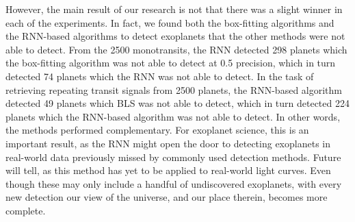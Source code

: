 However, the main result of our research is not that there was a slight winner in each of the experiments. In fact, we found both the box-fitting algorithms and the RNN-based algorithms to detect exoplanets that the other methods were not able to detect. From the 2500 monotransits, the RNN detected 298 planets which the box-fitting algorithm was not able to detect at 0.5 precision, which in turn detected 74 planets which the RNN was not able to detect. In the task of retrieving repeating transit signals from 2500 planets, the RNN-based algorithm detected 49 planets which BLS was not able to detect, which in turn detected 224 planets which the RNN-based algorithm was not able to detect. In other words, the methods performed complementary. For exoplanet science, this is an important result, as the RNN might open the door to detecting exoplanets in real-world data previously missed by commonly used detection methods. Future will tell, as this method has yet to be applied to real-world light curves. Even though these may only include a handful of undiscovered exoplanets, with every new detection our view of the universe, and our place therein, becomes more complete.
